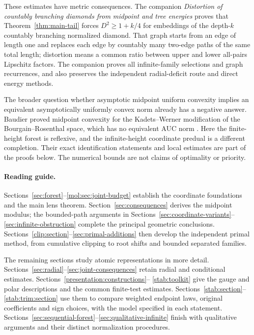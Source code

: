 These estimates have metric consequences. The companion
\emph{Distortion of countably branching diamonds from midpoint and tree energies}
\cite[Theorem~1.1]{DiamondEnergies} proves that Theorem~\ref{thm:main-tail} forces
$D^2\ge1+k/4$ for embeddings of the depth-$k$ countably branching
normalized diamond. That graph starts from an edge of length one and
replaces each edge by countably many two-edge paths of the same total
length; distortion means a common ratio between upper and lower
all-pairs Lipschitz factors. The companion proves all infinite-family
selections and graph recurrences, and also preserves the independent
radial-deficit route and direct energy methods.

The broader question whether asymptotic midpoint uniform convexity
implies an equivalent asymptotically uniformly convex norm already has a
negative answer. Baudier proved midpoint convexity for the Kadets--Werner
modification of the Bourgain--Rosenthal space, which has no equivalent
AUC norm \cite[Theorem~1 and Corollary~1]{Baudier2026}. Here the
finite-height forest is reflexive, and the infinite-height coordinate
predual is a different completion. Their exact identification statements
and local estimates are part of the proofs below. The numerical bounds
are not claims of optimality or priority.


\paragraph{Reading guide.}
Sections~\ref{sec:forest}--\ref{mol:sec:joint-budget} establish the
coordinate foundations and the main lens theorem.
Section~\ref{sec:consequences} derives the midpoint modulus; the
bounded-path arguments in Sections~\ref{sec:coordinate-variants}--
\ref{sec:infinite-obstruction} complete the principal geometric
conclusions. Sections~\ref{clip:section}--\ref{sec:primal-additions}
then develop the independent primal method, from cumulative clipping
to root shifts and bounded separated families.

The remaining sections study atomic representations in more detail.
Sections~\ref{sec:radial}--\ref{sec:joint-consequences} retain radial
and conditional estimates. Sections~\ref{presentation:constructions}--
\ref{stab:toolkit} give the gauge and polar descriptions and the common
finite-test estimates. Sections~\ref{stab:section}--\ref{stab:trim:section}
use them to compare weighted endpoint laws, original coefficients and
sign choices, with the model specified in each statement.
Sections~\ref{sec:sequential-forest}--\ref{sec:qualitative-infinite}
finish with qualitative arguments and their distinct normalization
procedures.
